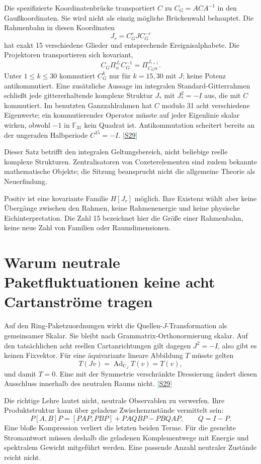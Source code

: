 \documentclass[11pt,a4paper,oneside,parskip=half,headings=normal,numbers=noenddot,bibliography=totoc]{scrreprt}
\newcommand{\F}{\mathbb F}
\newcommand{\src}[1]{\textcolor{teal}{\small[\hyperref[s:#1]{S#1}]}}
\begin{document}
Die spezifizierte Koordinatenbrücke transportiert $C$ zu $C_G=ACA^{-1}$ in den Gaußkoordinaten. Sie wird nicht als einzig mögliche Brückenwahl behauptet. Die Rahmenbahn in diesen Koordinaten
\[
 J_r=C_G^rJC_G^{-r}
\]
hat exakt 15 verschiedene Glieder und entsprechende Ereignisalphabete. Die Projektoren transportieren sich kovariant,
\[
 C_G\Pi_\alpha^{J_r}C_G^{-1}=\Pi_{C_G\alpha}^{J_{r+1}}.
\]
Unter $1\le k\le30$ kommutiert $C_G^k$ nur für $k=15,30$ mit $J$; keine Potenz antikommutiert. Eine zusätzliche Aussage im integralen Standard-Gitterrahmen schließt jede gittererhaltende komplexe Struktur $J_*$ mit $J_*^2=-I$ aus, die mit $C$ kommutiert. Im benutzten Ganzzahlrahmen hat $C$ modulo 31 acht verschiedene Eigenwerte; ein kommutierender Operator müsste auf jeder Eigenlinie skalar wirken, obwohl $-1$ in $\F_{31}$ kein Quadrat ist. Antikommutation scheitert bereits an der ungeraden Halbperiode $C^{15}=-I$. \src{29}

Dieser Satz betrifft den integralen Geltungsbereich, nicht beliebige reelle komplexe Strukturen. Zentralisatoren von Coxeterelementen sind zudem bekannte mathematische Objekte; die Sitzung beansprucht nicht die allgemeine Theorie als Neuerfindung. \cite{coxeter}

Positiv ist eine kovariante Familie $H[J_r]$ möglich. Ihre Existenz wählt aber keine Übergänge zwischen den Rahmen, keine Rahmenenergie und keine physische Eichinterpretation. Die Zahl 15 bezeichnet hier die Größe einer Rahmenbahn, keine neue Zahl von Familien oder Raumdimensionen.

\section{Warum neutrale Paketfluktuationen keine acht Cartanströme tragen}
Auf den Ring-Paketzuordnungen wirkt die Quellen-$J$-Transformation als gemeinsamer Skalar. Sie bleibt nach Grammatrix-Orthonormierung skalar. Auf den tatsächlichen acht reellen Cartanrichtungen gilt dagegen $J^2=-I$, also gibt es keinen Fixvektor. Für eine äquivariante lineare Abbildung $T$ müsste gelten
\[
 T(Jv)=\operatorname{Ad}_{U_J}T(v)=T(v),
\]
und damit $T=0$. Eine mit der Symmetrie verschränkte Dressierung ändert diesen Ausschluss innerhalb des neutralen Raums nicht. \src{29}

Die richtige Lehre lautet nicht, neutrale Observablen zu verwerfen. Ihre Produktstruktur kann über geladene Zwischenzustände vermittelt sein:
\[
 P[A,B]P=[PAP,PBP]+PAQBP-PBQAP,\qquad Q=I-P.
\]
Eine bloße Kompression verliert die letzten beiden Terme. Für die gesuchte Stromantwort müssen deshalb die geladenen Komplementwege mit Energie und spektralem Gewicht mitgeführt werden. Eine passende Anzahl neutraler Zustände reicht nicht.
\end{document}
